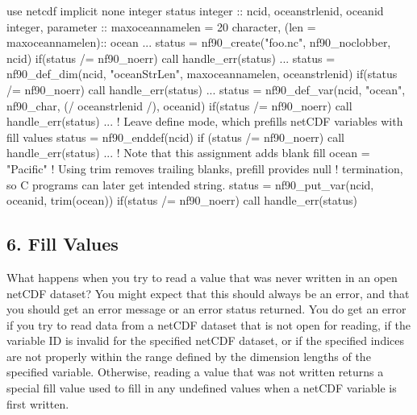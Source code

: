 \begin{DoxyCode}
\textcolor{keywordtype}{use }netcdf
\textcolor{keywordtype}{implicit none}
\textcolor{keywordtype}{integer} status
\textcolor{keywordtype}{integer}                           :: ncid, oceanstrlenid, oceanid
\textcolor{keywordtype}{integer}, \textcolor{keywordtype}{parameter}                :: maxoceannamelen = 20
\textcolor{keywordtype}{character}, (len = maxoceannamelen):: ocean
...
status = nf90\_create(\textcolor{stringliteral}{"foo.nc"}, nf90\_noclobber, ncid)
\textcolor{keywordflow}{if}(status /= nf90\_noerr) \textcolor{keyword}{call }handle\_err(status)
...
status = nf90\_def\_dim(ncid, \textcolor{stringliteral}{"oceanStrLen"}, maxoceannamelen, oceanstrlenid)
\textcolor{keywordflow}{if}(status /= nf90\_noerr) \textcolor{keyword}{call }handle\_err(status)
...
status = nf90\_def\_var(ncid, \textcolor{stringliteral}{"ocean"}, nf90\_char, (/ oceanstrlenid /), oceanid)
\textcolor{keywordflow}{if}(status /= nf90\_noerr) \textcolor{keyword}{call }handle\_err(status)
...
\textcolor{comment}{! Leave define mode, which prefills netCDF variables with fill values}
status = nf90\_enddef(ncid)
\textcolor{keywordflow}{if} (status /= nf90\_noerr) \textcolor{keyword}{call }handle\_err(status)
...
\textcolor{comment}{! Note that this assignment adds blank fill}
ocean = \textcolor{stringliteral}{"Pacific"}
\textcolor{comment}{! Using trim removes trailing blanks, prefill provides null}
\textcolor{comment}{! termination, so C programs can later get intended string.}
status = nf90\_put\_var(ncid, oceanid, trim(ocean))
\textcolor{keywordflow}{if}(status /= nf90\_noerr) \textcolor{keyword}{call }handle\_err(status)
\end{DoxyCode}
\hypertarget{f90-variables_f90-fill-values}{}\subsection{6. Fill Values }\label{f90-variables_f90-fill-values}
What happens when you try to read a value that was never written in an open net\+C\+DF dataset? You might expect that this should always be an error, and that you should get an error message or an error status returned. You do get an error if you try to read data from a net\+C\+DF dataset that is not open for reading, if the variable ID is invalid for the specified net\+C\+DF dataset, or if the specified indices are not properly within the range defined by the dimension lengths of the specified variable. Otherwise, reading a value that was not written returns a special fill value used to fill in any undefined values when a net\+C\+DF variable is first written.

